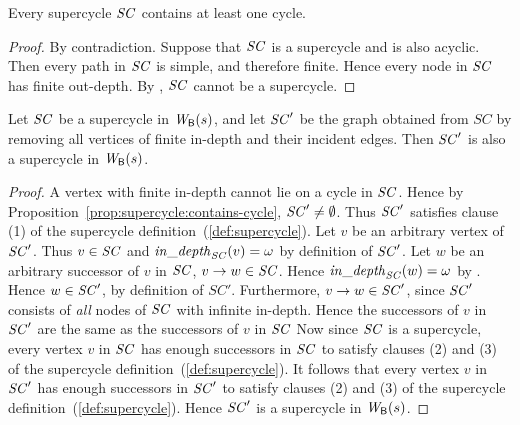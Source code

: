 \begin{proposition} \label{prop:supercycle:contains-cycle}
Every supercycle $\mathit{SC}$ contains at least one cycle.
\end{proposition} 
%
\begin{proof}
By contradiction. Suppose that $\mathit{SC}$ is a supercycle and is also acyclic. Then every path in $\mathit{SC}$ is simple, and therefore finite.  Hence every
node in $\mathit{SC}$ has finite out-depth. By , $\mathit{SC}$ cannot be a supercycle.
\end{proof}


\begin{proposition} \label{prop:supercycle:essential-subgraph-of} 
Let $\mathit{SC}$ be a supercycle in $\mathit{W}_{\mathsf{B}}({s})$, and let $\mathit{SC}'$ be the
graph obtained from $SC$ by removing all vertices of finite in-depth
and their incident edges. Then $\mathit{SC}'$ is also a supercycle in
$\mathit{W}_{\mathsf{B}}({s})$. 
\end{proposition} 
%
\begin{proof}
A vertex with finite in-depth cannot lie on a cycle in $\mathit{SC}$.  Hence
by Proposition~\ref{prop:supercycle:contains-cycle}, $\mathit{SC}' \neq
\emptyset$. Thus $\mathit{SC}'$ satisfies clause (1) of the supercycle
definition~(\ref{def:supercycle}).
%
Let $v$ be an arbitrary vertex of $\mathit{SC}'$.  Thus $v \in \mathit{SC}$ and $\mathit{in\_depth}_{\mathit{SC}}({v}) = \omega$ by definition of $\mathit{SC}'$. Let
$w$ be an arbitrary successor of $v$ in $\mathit{SC}$, \ie $v \rightarrow w \in \mathit{SC}$.
Hence $\mathit{in\_depth}_{\mathit{SC}}({w}) = \omega$ by . Hence $w \in \mathit{SC}'$, by definition of $SC'$.
Furthermore, $v \rightarrow w \in \mathit{SC}'$, since $\mathit{SC}'$ consists of
\emph{all} nodes of $\mathit{SC}$ with infinite in-depth. Hence the successors of $v$ in $\mathit{SC}'$ are
the same as the successors of $v$ in $\mathit{SC}$
%
Now since $\mathit{SC}$ is a supercycle, every vertex $v$ in $\mathit{SC}$ has enough successors in $\mathit{SC}$ to satisfy clauses (2) and (3)
of the supercycle definition~(\ref{def:supercycle}). It follows that every vertex $v$ in $\mathit{SC}'$ has enough successors in
$\mathit{SC}'$ to satisfy clauses (2) and (3) of the supercycle definition~(\ref{def:supercycle}).  
Hence $\mathit{SC}'$ is a supercycle in $\mathit{W}_{\mathsf{B}}({s})$. 
\end{proof}
